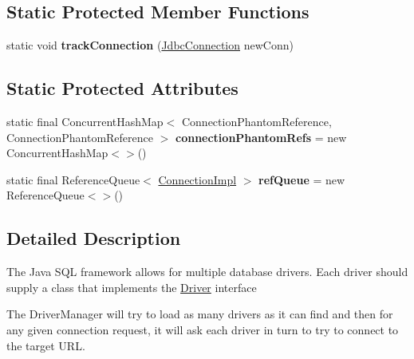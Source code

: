 \subsection*{Static Protected Member Functions}
\begin{DoxyCompactItemize}
\item 
\mbox{\label{classcom_1_1mysql_1_1cj_1_1jdbc_1_1_non_registering_driver_af5d0136e48b6fc7f86919ff737840950}} 
static void {\bfseries track\+Connection} (\mbox{\hyperlink{interfacecom_1_1mysql_1_1cj_1_1jdbc_1_1_jdbc_connection}{Jdbc\+Connection}} new\+Conn)
\end{DoxyCompactItemize}
\subsection*{Static Protected Attributes}
\begin{DoxyCompactItemize}
\item 
\mbox{\label{classcom_1_1mysql_1_1cj_1_1jdbc_1_1_non_registering_driver_a3c1f45389d1b114801ab9a0054a72a56}} 
static final Concurrent\+Hash\+Map$<$ Connection\+Phantom\+Reference, Connection\+Phantom\+Reference $>$ {\bfseries connection\+Phantom\+Refs} = new Concurrent\+Hash\+Map$<$$>$()
\item 
\mbox{\label{classcom_1_1mysql_1_1cj_1_1jdbc_1_1_non_registering_driver_aad570b2f650c5e4f22c47374bd2f8b6c}} 
static final Reference\+Queue$<$ \mbox{\hyperlink{classcom_1_1mysql_1_1cj_1_1jdbc_1_1_connection_impl}{Connection\+Impl}} $>$ {\bfseries ref\+Queue} = new Reference\+Queue$<$$>$()
\end{DoxyCompactItemize}


\subsection{Detailed Description}
The Java S\+QL framework allows for multiple database drivers. Each driver should supply a class that implements the \mbox{\hyperlink{classcom_1_1mysql_1_1cj_1_1jdbc_1_1_driver}{Driver}} interface

The Driver\+Manager will try to load as many drivers as it can find and then for any given connection request, it will ask each driver in turn to try to connect to the target U\+RL. 

